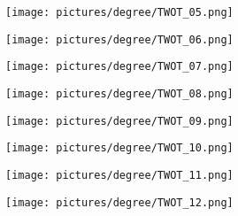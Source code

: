 \begin{figure} \ContinuedFloat
        \centering
        \begin{subfigure}{.49\textwidth}
                \centering
                \texttt{[image: pictures/degree/TWOT\_05.png]}
        \end{subfigure}
        \begin{subfigure}{.49\textwidth}
                \centering
                \texttt{[image: pictures/degree/TWOT\_06.png]}
        \end{subfigure}
\end{figure}
\begin{figure} \ContinuedFloat
        \centering
        \begin{subfigure}{.49\textwidth}
                \centering
                \texttt{[image: pictures/degree/TWOT\_07.png]}
        \end{subfigure}
        \begin{subfigure}{.49\textwidth}
                \centering
                \texttt{[image: pictures/degree/TWOT\_08.png]}
        \end{subfigure}
\end{figure}
\begin{figure} \ContinuedFloat
        \centering
        \begin{subfigure}{.49\textwidth}
                \centering
                \texttt{[image: pictures/degree/TWOT\_09.png]}
        \end{subfigure}
        \begin{subfigure}{.49\textwidth}
                \centering
                \texttt{[image: pictures/degree/TWOT\_10.png]}
        \end{subfigure}
\end{figure}
\begin{figure} \ContinuedFloat
        \centering
        \begin{subfigure}{.49\textwidth}
                \centering
                \texttt{[image: pictures/degree/TWOT\_11.png]}
        \end{subfigure}
        \begin{subfigure}{.49\textwidth}
                \centering
                \texttt{[image: pictures/degree/TWOT\_12.png]}
        \end{subfigure}
\end{figure}

